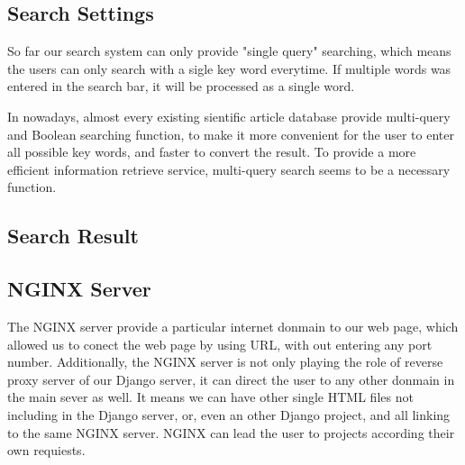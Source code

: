 \subsection{Search Settings}
So far our search system can only provide "single query" searching, which means the users can only search with a sigle key word everytime.
If multiple words was entered in the search bar, it will be processed as a single word.

In nowadays, almost every existing sientific article database provide multi-query and Boolean searching function,
to make it more convenient for the user to enter all possible key words,
and faster to convert the result.
To provide a more efficient information retrieve service,
multi-query search seems to be a necessary function.

\subsection{Search Result}


\subsection{NGINX Server}
The NGINX server provide a particular internet donmain to our web page,
which allowed us to conect the web page by using URL,
with out entering any port number. Additionally,
the NGINX server is not only playing the role of reverse proxy server of our Django server,
it can direct the user to any other donmain in the main sever as well.
It means we can have other single HTML files not including in the Django server, or,
even an other Django project, and all linking to the same NGINX server.
NGINX can lead the user to projects according their own requiests. 